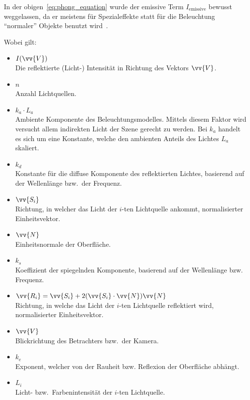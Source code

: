 In der obigen~\autoref{eq:phong_equation} wurde der emissive Term
$I_{\text{emissive}}$ bewusst weggelassen, da er meistens für
Spezialeffekte statt für die Beleuchtung ``normaler'' Objekte benutzt
wird~\parencite{hughes_computer_2013}.

Wobei gilt:

\begin{itemize}
    \item $I(\vv{V})$\\
        Die reflektierte (Licht-) Intensität in Richtung des Vektors
        $\vv{V}$.

    \item $n$\\
        Anzahl Lichtquellen.

    \item $k_{a} \cdot L_{a}$\\
        Ambiente Komponente des Beleuchtungsmodelles. Mittels diesem
        Faktor wird versucht allem indirekten Licht der Szene gerecht zu
        werden. Bei $k_{a}$ handelt es sich um eine Konstante, welche
        den ambienten Anteils des Lichtes $L_{a}$ skaliert.

    \item $k_{d}$\\
        Konstante für die diffuse Komponente des reflektierten Lichtes,
        basierend auf der Wellenlänge bzw.\ der Frequenz.

    \item $\vv{S_{i}}$\\
        Richtung, in welcher das Licht der $i$-ten Lichtquelle ankommt,
        normalisierter Einheitsvektor.

    \item $\vv{N}$\\
        Einheitsnormale der Oberfläche.

    \item $k_{s}$\\
        Koeffizient der spiegelnden Komponente, basierend auf der
        Wellenlänge bzw. Frequenz.

    \item $\vv{R_{i}} = \vv{S_{i}} + 2(\vv{S_{i}} \cdot \vv{N})\vv{N}$\\
        Richtung, in welche das Licht der $i$-ten Lichtquelle
        reflektiert wird, normalisierter Einheitsvektor.

    \item $\vv{V}$\\
        Blickrichtung des Betrachters bzw.\ der Kamera.

    \item $k_{e}$\\
        Exponent, welcher von der Rauheit
        bzw.  Reflexion der Oberfläche abhängt.
    \item $L_{i}$\\
        Licht- bzw.\ Farbenintensität der $i$-ten Lichtquelle.
\end{itemize}

